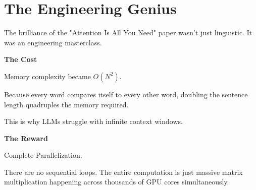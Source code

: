 \documentclass[11pt]{article}
\begin{document}
\vfill
\newpage


\section*{The Engineering Genius}

\vspace{0.1in}

The brilliance of the "Attention Is All You Need" paper wasn't just linguistic. It was an engineering masterclass.

\vspace{0.15in}

\begin{minipage}[t]{0.47\textwidth}

{\large\color{brandorange}\textbf{The Cost}}

\vspace{0.05in}

Memory complexity became $O(N^2)$. 

Because every word compares itself to every other word, doubling the sentence length quadruples the memory required. 

This is why LLMs struggle with infinite context windows.

\end{minipage}
\hfill
\begin{minipage}[t]{0.47\textwidth}

{\large\color{brandblue}\textbf{The Reward}}

\vspace{0.05in}

Complete Parallelization.

There are no sequential loops. The entire computation is just massive matrix multiplication happening across thousands of GPU cores simultaneously.

\end{minipage}

\vspace{0.2in}
\end{document}
